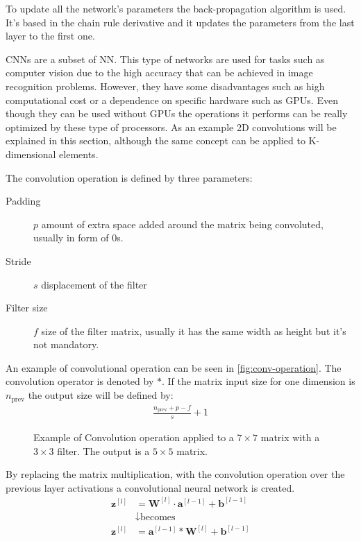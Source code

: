 To update all the network's parameters the back-propagation algorithm is used. It's based
in the chain rule derivative and it updates the parameters from the last layer to the first
one.
~\cite{neural:efficient-backprop}



\glspl{CNN} are a subset of \gls{NN}. This type of networks are used for tasks such as computer vision
due to the high accuracy that can be achieved in image recognition problems. However, they have
some disadvantages such as high computational cost or a dependence on specific hardware such as GPUs.
Even though they can be used without GPUs the operations it performs can be really optimized by these
type of processors. As an example 2D convolutions will be explained in this section, although the 
same concept can be applied to K-dimensional elements.

The convolution operation is defined by three parameters:
\begin{description}
  \item[Padding] \( p \) amount of extra space added around the matrix being convoluted, usually in
  form of 0s.
  \item[Stride] \( s \) displacement of the filter
  \item[Filter size] \( f \) size of the filter matrix, usually it has the same width as height but
  it's not mandatory.
\end{description}

An example of convolutional operation can be seen in \autoref{fig:conv-operation}. The convolution
operator is denoted by \( * \). If the matrix input size for one dimension is \( n_{\text{prev}} \)
the output size will be defined by:
\begin{align*}
  \frac{n_{\text{prev}} + p - f}{s} + 1
\end{align*}

\begin{figure}
  \centering
  
  \caption[Convolution operation example]{
    Example of Convolution operation applied to a \( 7 \times 7 \) matrix with a 
    \( 3 \times 3 \) filter. The output is a \( 5 \times 5 \) matrix.
    \label{fig:conv-operation}
  }
\end{figure}

By replacing the matrix multiplication, with the convolution operation over the previous layer 
activations a convolutional neural network is created. 
\begin{align*}
  \bm{z}^{[l]} &= \bm{W}^{[l]} \cdot \bm{a}^{[l - 1]} + \bm{b}^{[l - 1]} \\
  &\downarrow \text{becomes} \\
  \bm{z}^{[l]} &= \bm{a}^{[l - 1]} * \bm{W}^{[l]} + \bm{b}^{[l - 1]}
\end{align*}

